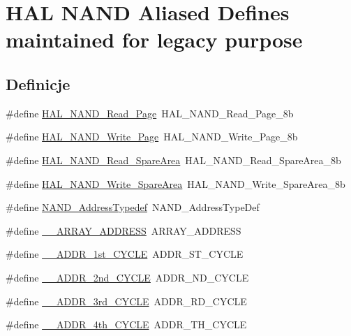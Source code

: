 \hypertarget{group___h_a_l___n_a_n_d___aliased___defines}{}\section{H\+AL N\+A\+ND Aliased Defines maintained for legacy purpose}
\label{group___h_a_l___n_a_n_d___aliased___defines}
\subsection*{Definicje}
\begin{DoxyCompactItemize}
\item 
\#define \hyperlink{group___h_a_l___n_a_n_d___aliased___defines_ga042b596f4c19c36ccc75780341b36439}{H\+A\+L\+\_\+\+N\+A\+N\+D\+\_\+\+Read\+\_\+\+Page}~H\+A\+L\+\_\+\+N\+A\+N\+D\+\_\+\+Read\+\_\+\+Page\+\_\+8b
\item 
\#define \hyperlink{group___h_a_l___n_a_n_d___aliased___defines_gae90b404d2ee2c8b4b82b949a129b2e61}{H\+A\+L\+\_\+\+N\+A\+N\+D\+\_\+\+Write\+\_\+\+Page}~H\+A\+L\+\_\+\+N\+A\+N\+D\+\_\+\+Write\+\_\+\+Page\+\_\+8b
\item 
\#define \hyperlink{group___h_a_l___n_a_n_d___aliased___defines_gac185e8ab0a9ca5a4d67d1cde47c881c4}{H\+A\+L\+\_\+\+N\+A\+N\+D\+\_\+\+Read\+\_\+\+Spare\+Area}~H\+A\+L\+\_\+\+N\+A\+N\+D\+\_\+\+Read\+\_\+\+Spare\+Area\+\_\+8b
\item 
\#define \hyperlink{group___h_a_l___n_a_n_d___aliased___defines_ga6f54130ce2531ca52862006428e50e9d}{H\+A\+L\+\_\+\+N\+A\+N\+D\+\_\+\+Write\+\_\+\+Spare\+Area}~H\+A\+L\+\_\+\+N\+A\+N\+D\+\_\+\+Write\+\_\+\+Spare\+Area\+\_\+8b
\item 
\#define \hyperlink{group___h_a_l___n_a_n_d___aliased___defines_gab3708b27e7380fc5270b5196b71b93aa}{N\+A\+N\+D\+\_\+\+Address\+Typedef}~N\+A\+N\+D\+\_\+\+Address\+Type\+Def
\item 
\#define \hyperlink{group___h_a_l___n_a_n_d___aliased___defines_gaeaae78138cfccceb8668c896eb8fb634}{\+\_\+\+\_\+\+A\+R\+R\+A\+Y\+\_\+\+A\+D\+D\+R\+E\+SS}~A\+R\+R\+A\+Y\+\_\+\+A\+D\+D\+R\+E\+SS
\item 
\#define \hyperlink{group___h_a_l___n_a_n_d___aliased___defines_ga1e95b9f6b605085f2b0ad95794841a7b}{\+\_\+\+\_\+\+A\+D\+D\+R\+\_\+1st\+\_\+\+C\+Y\+C\+LE}~A\+D\+D\+R\+\_\+S\+T\+\_\+\+C\+Y\+C\+LE
\item 
\#define \hyperlink{group___h_a_l___n_a_n_d___aliased___defines_gaa1477fe89e780f7da3e780d29a97a9b1}{\+\_\+\+\_\+\+A\+D\+D\+R\+\_\+2nd\+\_\+\+C\+Y\+C\+LE}~A\+D\+D\+R\+\_\+N\+D\+\_\+\+C\+Y\+C\+LE
\item 
\#define \hyperlink{group___h_a_l___n_a_n_d___aliased___defines_ga4316e40c7905baa397537633d191fa31}{\+\_\+\+\_\+\+A\+D\+D\+R\+\_\+3rd\+\_\+\+C\+Y\+C\+LE}~A\+D\+D\+R\+\_\+R\+D\+\_\+\+C\+Y\+C\+LE
\item 
\#define \hyperlink{group___h_a_l___n_a_n_d___aliased___defines_ga012bb903469430b21f4bbca8ce3c7654}{\+\_\+\+\_\+\+A\+D\+D\+R\+\_\+4th\+\_\+\+C\+Y\+C\+LE}~A\+D\+D\+R\+\_\+T\+H\+\_\+\+C\+Y\+C\+LE
\end{DoxyCompactItemize}


